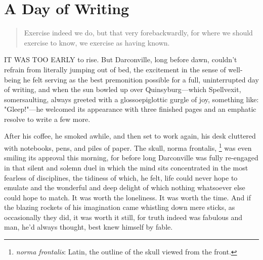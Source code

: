 \chapter{A Day of Writing}
 
\begin{quotation} 
  Exercise indeed we do, but that very forebackwardly,
  for where we should exercise to know, we exercise as having known.
\end{quotation}
\vspace{0.2cm}
 
 
  IT WAS TOO EARLY to rise. But Darconville, long before dawn, couldn't refrain
from literally jumping out of bed, the excitement in the sense of well-being he
felt serving as the best premonition 
possible for a full, uninterrupted day of writing, and when the sun bowled up 
over Quinsyburg---which Spellvexit, somersaulting, 
always greeted with a glossoepiglottic 
gurgle 
of joy, something
like: "Gleep!"---he welcomed its appearance with three finished pages and an
emphatic resolve to write a few more.

  After his coffee, he smoked awhile, and then set to work again, his desk
cluttered with notebooks, pens, and piles of paper. The skull, norma frontalis,
\footnote{ \textit{norma frontalis}: Latin, the outline of the skull viewed from
  the front.}
was even smiling its approval this morning, for before long Darconville was
fully re-engaged in that silent and solemn duel in which the mind sits
concentrated in the most fearless of disciplines, the tidiness of which, he
felt, life could never hope to emulate and the wonderful and deep delight of
which nothing whatsoever else could hope to match. It was worth the loneliness.
It was worth the time. And if the blazing rockets of his imagination came
whistling down mere sticks, as occasionally they did, it was worth it still, for
truth indeed was fabulous and man, he'd always thought, best knew himself by
fable.

